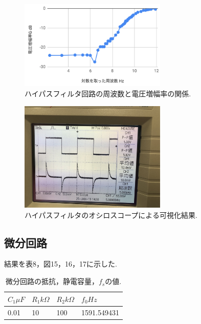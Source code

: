 \documentclass[twocolumn, 10pt,a4j]{jsarticle}
\begin{document}
          \begin{figure}[]
            \begin{center}
                \includegraphics[width=7cm]{../img/high_result.png}
                \caption{ハイパスフィルタ回路の周波数と電圧増幅率の関係.}
            \end{center}
          \end{figure}

          \begin{figure}[]
            \begin{center}
                \includegraphics[width=7cm]{../img/result_high_pass_vis.jpg}
                \caption{ハイパスフィルタのオシロスコープによる可視化結果.}
            \end{center}
          \end{figure}


      \subsection{微分回路}
          結果を表8，図15，16，17に示した.



          \begin{table}[H]
            \centering
            \footnotesize
            \caption{微分回路の抵抗，静電容量，$f_{s}$の値.}
            \label{opeanpu_risouteki_tokusei}
            \begin{tabular}{llll} \hline
              $C_{1} \mu F$ & $R_{1} k \Omega$& $R_{2} k \Omega$& $f_{0} Hz$ \\ \hline
              0.01&	10&	100&	1591.549431 \\ \hline
            \end{tabular}
          \end{table}
\end{document}
